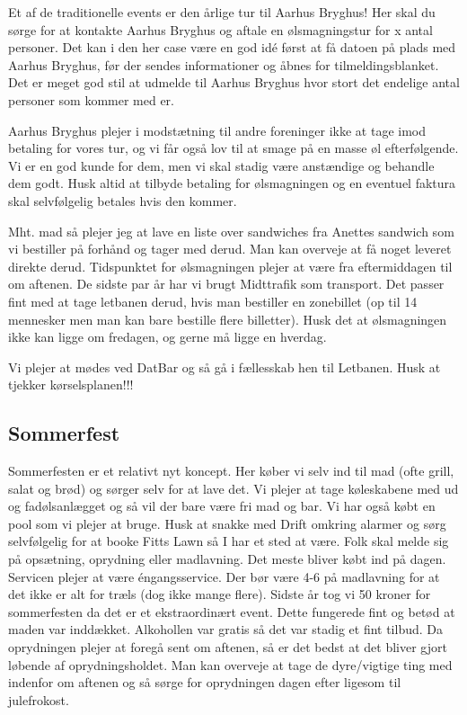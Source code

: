 Et af de traditionelle events er den årlige tur til Aarhus Bryghus!
Her skal du sørge for at kontakte Aarhus Bryghus og aftale en
ølsmagningstur for x antal personer. Det kan i den her case være en
god idé først at få datoen på plads med Aarhus Bryghus, før der sendes
informationer og åbnes for tilmeldingsblanket. Det er meget god stil at udmelde til Aarhus Bryghus hvor stort det endelige antal personer som kommer med er.

Aarhus Bryghus plejer i modstætning til andre foreninger ikke at tage imod betaling for vores tur, og vi får også lov til at smage på en masse øl efterfølgende. Vi er en god kunde for dem, men vi skal stadig være anstændige og behandle dem godt. Husk altid at tilbyde betaling for ølsmagningen og en eventuel faktura skal selvfølgelig betales hvis den kommer.

Mht. mad så plejer jeg at lave en liste over sandwiches fra Anettes sandwich som vi bestiller på forhånd og tager med derud. Man kan overveje at få noget leveret direkte derud. Tidspunktet for ølsmagningen plejer at være fra eftermiddagen til om aftenen. De sidste par år har vi brugt Midttrafik som transport. Det passer fint med at tage letbanen derud, hvis man bestiller en zonebillet (op til 14 mennesker men man kan bare bestille flere billetter). Husk det at ølsmagningen ikke kan ligge om fredagen, og gerne må ligge en hverdag.

Vi plejer at mødes ved DatBar og så gå i fællesskab hen til Letbanen. Husk at tjekker kørselsplanen!!!

\subsection*{Sommerfest}
Sommerfesten er et relativt nyt koncept. Her køber vi selv ind til mad (ofte grill, salat og brød) og sørger selv for at lave det. Vi plejer at tage køleskabene med ud og fadølsanlægget og så vil der bare være fri mad og bar. Vi har også købt en pool som vi plejer at bruge. Husk at snakke med Drift omkring alarmer og sørg selvfølgelig for at booke Fitts Lawn så I har et sted at være. Folk skal melde sig på opsætning, oprydning eller madlavning. Det meste bliver købt ind på dagen. Servicen plejer at være éngangsservice. Der bør være 4-6 på madlavning for at det ikke er alt for træls (dog ikke mange flere). Sidste år tog vi 50 kroner for sommerfesten da det er et ekstraordinært event. Dette fungerede fint og betød at maden var inddækket. Alkohollen var gratis så det var stadig et fint tilbud. Da oprydningen plejer at foregå sent om aftenen, så er det bedst at det bliver gjort løbende af oprydningsholdet. Man kan overveje at tage de dyre/vigtige ting med indenfor om aftenen og så sørge for oprydningen dagen efter ligesom til julefrokost.

